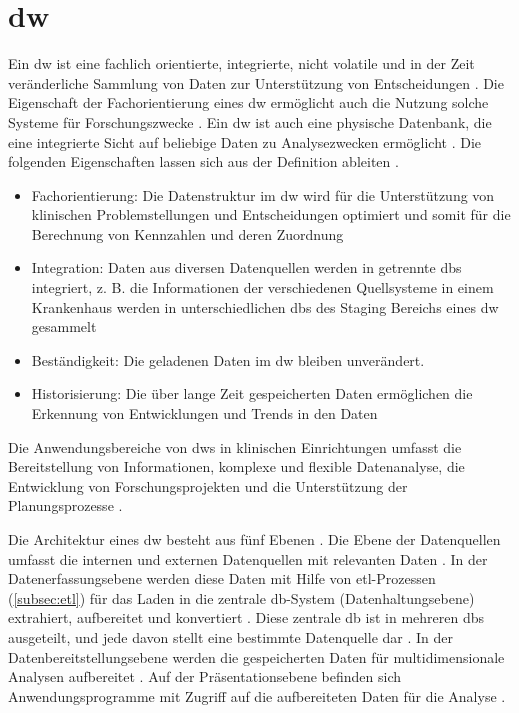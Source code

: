 \section{\acl{dw}} \label{sec:dw}

Ein \acf{dw} ist \glqq eine fachlich orientierte, integrierte, nicht volatile und in der Zeit veränderliche Sammlung von Daten zur Unterstützung von Entscheidungen\grqq{} \cite{dworiginal}. Die Eigenschaft der Fachorientierung eines \ac{dw} ermöglicht auch die Nutzung solche Systeme für Forschungszwecke \cite{dwhcliniinv}. Ein \ac{dw} ist auch \glqq eine physische Datenbank, die eine integrierte Sicht auf beliebige Daten zu Analysezwecken ermöglicht\grqq{} \cite{dwgoeken}. Die folgenden Eigenschaften lassen sich aus der Definition ableiten \cite{planungdatawarehouse}.

\begin{itemize}
	\item Fachorientierung: Die Datenstruktur im \ac{dw} wird für die Unterstützung von klinischen Problemstellungen und Entscheidungen optimiert und somit für die Berechnung von Kennzahlen und deren Zuordnung
	\item Integration: Daten aus diversen Datenquellen werden in getrennte \acp{db} integriert, z. B. die Informationen der verschiedenen Quellsysteme in einem Krankenhaus werden in unterschiedlichen \acp{db} des Staging Bereichs eines \ac{dw} gesammelt
	\item Beständigkeit: Die geladenen Daten im \ac{dw} bleiben unverändert.
	\item Historisierung: Die über lange Zeit gespeicherten Daten ermöglichen die Erkennung von Entwicklungen und Trends in den Daten
\end{itemize}

Die Anwendungsbereiche von \acp{dw} in klinischen Einrichtungen umfasst die Bereitstellung von Informationen, komplexe und flexible Datenanalyse, die Entwicklung von Forschungsprojekten und die Unterstützung der Planungsprozesse \cite{planungdatawarehouse}.

Die Architektur eines \ac{dw} besteht aus fünf Ebenen \cite{dwbauer}. Die Ebene der Datenquellen umfasst die internen und externen Datenquellen mit relevanten Daten \cite{dwgoeken}. In der Datenerfassungsebene werden diese Daten mit Hilfe von \ac{etl}-Prozessen (\ref{subsec:etl}) für das Laden in die zentrale \ac{db}-System (Datenhaltungsebene) extrahiert, aufbereitet und konvertiert \cite{dworiginal}. Diese zentrale \ac{db} ist in mehreren \acp{db} ausgeteilt, und jede davon stellt eine bestimmte Datenquelle dar \cite{dwgoeken}. In der Datenbereitstellungsebene werden die gespeicherten Daten für multidimensionale Analysen aufbereitet \cite{dwbauer}. Auf der Präsentationsebene befinden sich Anwendungsprogramme mit Zugriff auf die aufbereiteten Daten für die Analyse \cite{dwtool}.

